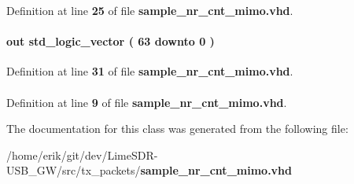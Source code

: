 Definition at line {\bf 25} of file {\bf sample\+\_\+nr\+\_\+cnt\+\_\+mimo.\+vhd}.

\paragraph[{sample\+\_\+nr}]{ {\bfseries \textcolor{keywordflow}{out}\textcolor{vhdlchar}{ }} {\bfseries \textcolor{comment}{std\+\_\+logic\+\_\+vector}\textcolor{vhdlchar}{ }\textcolor{vhdlchar}{(}\textcolor{vhdlchar}{ }\textcolor{vhdlchar}{ } \textcolor{vhdldigit}{63} \textcolor{vhdlchar}{ }\textcolor{keywordflow}{downto}\textcolor{vhdlchar}{ }\textcolor{vhdlchar}{ } \textcolor{vhdldigit}{0} \textcolor{vhdlchar}{ }\textcolor{vhdlchar}{)}\textcolor{vhdlchar}{ }} \hspace{0.3cm}{\ttfamily [Port]}}\label{classsample__nr__cnt__mimo_a10caf9163ea09d180b51375d18e6c77e}


Definition at line {\bf 31} of file {\bf sample\+\_\+nr\+\_\+cnt\+\_\+mimo.\+vhd}.

\paragraph[{std\+\_\+logic\+\_\+1164}]{\hspace{0.3cm}{\ttfamily [Package]}}\label{classsample__nr__cnt__mimo_acd03516902501cd1c7296a98e22c6fcb}


Definition at line {\bf 9} of file {\bf sample\+\_\+nr\+\_\+cnt\+\_\+mimo.\+vhd}.



The documentation for this class was generated from the following file\+:\begin{DoxyCompactItemize}
\item 
/home/erik/git/dev/\+Lime\+S\+D\+R-\/\+U\+S\+B\+\_\+\+G\+W/src/tx\+\_\+packets/{\bf sample\+\_\+nr\+\_\+cnt\+\_\+mimo.\+vhd}\end{DoxyCompactItemize}
